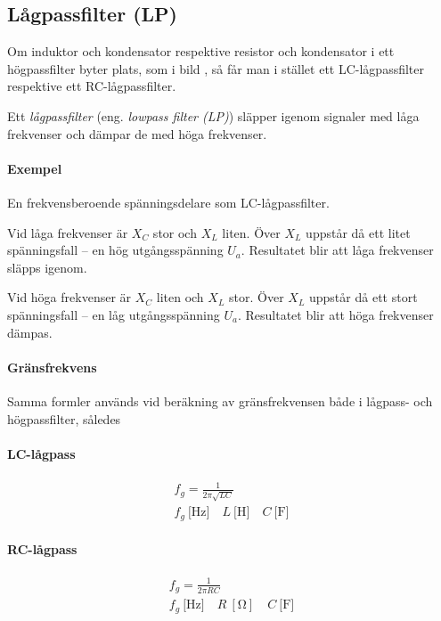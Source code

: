 \subsection{Lågpassfilter (LP)}
\label{lågpassfilter}


Om induktor och kondensator respektive resistor och kondensator i ett
högpassfilter byter plats, som i bild , så får man i
stället ett LC-lågpassfilter respektive ett RC-lågpassfilter.

Ett \emph{lågpassfilter} (eng. \emph{lowpass filter (LP)}) släpper igenom
signaler med låga frekvenser och dämpar de med höga frekvenser.

\paragraph{Exempel} En frekvensberoende spänningsdelare som LC-lågpassfilter.

Vid låga frekvenser är \(X_C\) stor och \(X_L\) liten.
Över \(X_L\) uppstår då ett litet spänningsfall -- en hög utgångsspänning
\(U_a\).
Resultatet blir att låga frekvenser släpps igenom.

Vid höga frekvenser är \(X_C\) liten och \(X_L\) stor.
Över \(X_L\) uppstår då ett stort spänningsfall -- en låg utgångsspänning
\(U_a\).
Resultatet blir att höga frekvenser dämpas.

\paragraph{Gränsfrekvens}

Samma formler används vid beräkning av gränsfrekvensen både i lågpass- och
högpassfilter, således

\paragraph{LC-lågpass}
\begin{gather*}
  f_g = \frac{1}{2\pi \sqrt{LC}} \\
  f_g\ \text{[Hz]} \quad L\ \text{[H]} \quad C\ \text{[F]}
\end{gather*}

\paragraph{RC-lågpass}
\begin{gather*}
  f_g = \frac{1}{2\pi {RC}} \\
  f_g\ \text{[Hz]} \quad R\ [\unit{\ohm}] \quad C\ \text{[F]}
\end{gather*}

